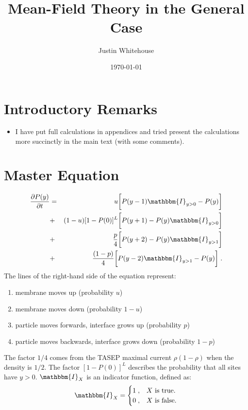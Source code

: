 \documentclass[a4paper,10pt]{article}
\title{Mean-Field Theory in the General Case}
\author{Justin Whitehouse}
\date{\today}
\newcommand{\pzero}{P(0)}
\newcommand{\I}{\mathbbm{I}}
\begin{document}
\maketitle
\tableofcontents

\section{Introductory Remarks}

\begin{itemize}
 \item I have put full calculations in appendices and tried present the calculations more succinctly in the main text (with some comments).
\end{itemize}


\section{Master Equation}

\begin{eqnarray}\label{eq:MASTER}
  \frac{\partial P(y)}{\partial t} & = & u \bigg[ P(y-1) \I_{y>0} - P(y) \bigg] \nonumber \\
				   & + & (1-u)[1-\pzero]^L \bigg[ P(y+1)  - P(y) \I_{y>0} \bigg] \nonumber \\
				   & + & \frac{p}{4} \bigg[ P(y+2) - P(y) \I_{y>1} \bigg] \nonumber \\
				   & + & \frac{(1-p)}{4} \bigg[ P(y-2) \I_{y>1} - P(y) \bigg] \;.
\end{eqnarray}
The lines of the right-hand side of the equation represent:
\begin{enumerate}
 \item membrane moves up (probability $u$)
 \item membrane moves down (probability $1-u$)
 \item particle moves forwards, interface grows up (probability $p$)
 \item particle moves backwards, interface grows down (probability $1-p$)
\end{enumerate}
The factor $1/4$ comes from the TASEP maximal current $\rho(1-\rho)$ when the density is $1/2$. The factor $[1-\pzero]^L$ describes the probability that all sites have $y>0$. $\I_X$ is an indicator function, defined as:
\begin{equation}
  \I_X = \begin{cases}
	    1 \;, & X\mbox{ is true.} \\
	    0 \;, & X\mbox{ is false.}
         \end{cases}
\end{equation}
\end{document}
